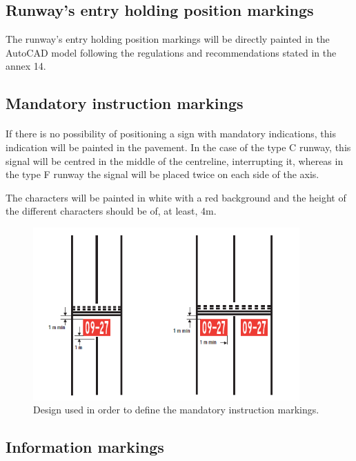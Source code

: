 		\subsection{Runway's entry holding position markings}
		The runway's entry holding position markings will be directly painted in the AutoCAD model following the regulations and recommendations stated in the annex 14.
				
		\subsection{Mandatory instruction markings}
		\paragraph{}If there is no possibility of positioning a sign with mandatory indications, this indication will be painted in the pavement. In the case of the type C runway, this signal will be centred in the middle of the centreline, interrupting it, whereas in the type F runway the signal will be placed twice on each side of the axis. 
		
		The characters will be painted in white with a red background and the height of the different characters should be of, at least, 4m.
		
		\begin{figure}[H]
			\centering
			\includegraphics[clip, trim=0cm 0cm 0cm 0cm, 	width=0.911\textwidth]{./images/markings/mandatorymarks}
			\caption{Design used in order to define the mandatory instruction markings.} %
			\label{} %
		\end{figure}
	
		\subsection{Information markings}
